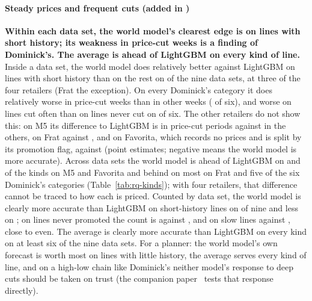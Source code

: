 \paragraph{Steady prices and frequent cuts (added in \thisrev{})}
\textbf{Within each data set, the world model's clearest edge is on lines with
short history; its weakness in price-cut weeks is a finding of Dominick's. The
average is ahead of LightGBM on every kind of line.} Inside a data set, the world
model does relatively better against LightGBM on lines with short history than
on the rest on \kShortBetterAll{} of the nine data sets, at three of the four
retailers (Frat the exception). On every Dominick's category it does relatively
worse in price-cut weeks than in other weeks (\kCutWorseDom{} of six), and worse
on lines cut often than on lines never cut on \kHeavyWorseDom{} of six. The other
retailers do not show this: on M5 its difference to LightGBM is \kDMfivePriceCutPeriods{}
in price-cut periods against \kDMfiveOtherPeriods{} in the others, on Frat
\kDFratPriceCutPeriods{} against \kDFratOtherPeriods{}, and on Favorita, which
records no prices and is split by its promotion flag, \kDFavPriceCutPeriods{}
against \kDFavOtherPeriods{} (point estimates; negative means the world model is
more accurate). Across data sets the world model is ahead of LightGBM on
\kAheadMfive{} and \kAheadFav{} of the \kKinds{} kinds on M5 and Favorita and behind
on most on Frat and five of the six Dominick's categories (Table~\ref{tab:rq-kinds});
with four retailers, that difference cannot be traced to how each is priced.
Counted by data set, the world model is clearly more accurate than LightGBM on
short-history lines on \kWmBetterShortHistory{} of nine and less on
\kWmWorseShortHistory; on lines never promoted the count is \kWmBetterNoPromotion{} against
\kWmWorseNoPromotion{}, and on slow lines \kWmBetterSlow{} against \kWmWorseSlow{}, close to even. The average is clearly more accurate than LightGBM on every kind on
at least six of the nine data sets. For a planner: the world model's own forecast
is worth most on lines with little history, the average serves every kind of line,
and on a high-low chain like Dominick's neither model's response to deep cuts
should be taken on trust (the companion paper~\cite{paper2} tests that response directly).



